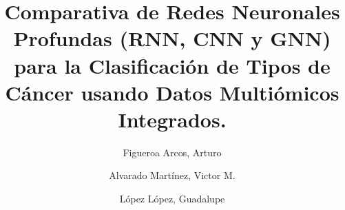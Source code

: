 \documentclass[review,12pt,times,number]{elsarticle}
\begin{document}
\begin{frontmatter}



\title{Comparativa de Redes Neuronales Profundas (RNN, CNN y GNN) para la Clasificación de Tipos de Cáncer usando Datos Multiómicos Integrados.}


\author[aff1]{Figueroa Arcos, Arturo}
\author[aff1]{Alvarado Martínez, Victor M.}
\author[aff1]{López López, Guadalupe}


\begin{abstract}




\end{abstract}
\end{frontmatter}
\end{document}
